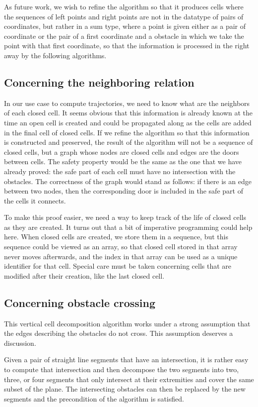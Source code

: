 \documentclass[a4paper, USenglish, cleveref, autoref, thm-restate]{lipics-v2021}
\begin{document}
As future work, we wish to refine the algorithm so that it produces
cells where the sequences of left points and right points are not in
the datatype of pairs of coordinates, but rather in a sum type, where
a point is given either as a pair of coordinate or the pair of a first
coordinate and a obstacle in which we take the point with that first
coordinate, so that the information is processed in the right away by
the following algorithms.
\subsection{Concerning the neighboring relation}
In our use case to compute trajectories, we need to know what are the
neighbors of each closed cell.  It seems obvious that this information
is already known at the time an open cell is created and could be
propagated along as the cells are added in the final cell of closed
cells.  If we refine the algorithm so that this information is
constructed and preserved, the result of the algorithm will not be a
sequence of closed cells, but a graph whose nodes are closed cells and
edges are the doors between cells.  The safety property would be the
same as the one that we have already proved: the safe part of each
cell must have no intersection with the obstacles.  The correctness of
the graph would stand as follows: if there is an edge between two
nodes, then the corresponding door is included in the safe part of the
cells it connects.

To make this proof easier, we need a way to keep track of the life of
closed cells as they are created.  It turns out that a bit of
imperative programming could help here.  When closed cells are
created, we store them in a sequence, but this sequence could be
viewed as an array, so that closed cell stored in that array never
moves afterwards, and the index in that array can be used as a unique
identifier for that cell.  Special care must be taken concerning cells
that are modified after their creation, like the last closed cell.
\subsection{Concerning obstacle crossing}
This vertical cell decomposition algorithm works under a strong
assumption that the edges describing the obstacles do not cross.  This
assumption deserves a discussion.

Given a pair of straight line segments that have an intersection, it
is rather easy to compute that intersection and then decompose the two
segments into two, three, or four segments that only intersect at
their extremities and cover the same subset of the plane.  The
intersecting obstacles can then be replaced by the new segments and
the precondition of the algorithm is satisfied.
\end{document}
